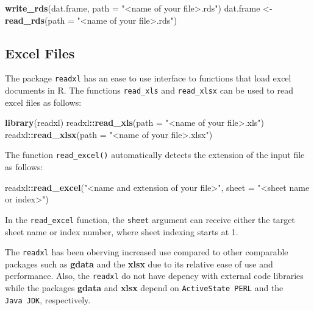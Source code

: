 \documentclass[]{book}
\newenvironment{Shaded}{\begin{snugshade}}{\end{snugshade}}
\newcommand{\KeywordTok}[1]{\textcolor[rgb]{0.13,0.29,0.53}{\textbf{#1}}}
\newcommand{\DataTypeTok}[1]{\textcolor[rgb]{0.13,0.29,0.53}{#1}}
\newcommand{\StringTok}[1]{\textcolor[rgb]{0.31,0.60,0.02}{#1}}
\newcommand{\OperatorTok}[1]{\textcolor[rgb]{0.81,0.36,0.00}{\textbf{#1}}}
\newcommand{\NormalTok}[1]{#1}
\theoremstyle{definition}
\theoremstyle{definition}
\theoremstyle{definition}
\theoremstyle{remark}
\begin{document}
\begin{Shaded}
\begin{Highlighting}[]
\KeywordTok{write_rds}\NormalTok{(dat.frame, }\DataTypeTok{path =} \StringTok{"<name of your file>.rds"}\NormalTok{)}
\NormalTok{dat.frame <-}\StringTok{ }\KeywordTok{read_rds}\NormalTok{(}\DataTypeTok{path =} \StringTok{"<name of your file>.rds"}\NormalTok{)}
\end{Highlighting}
\end{Shaded}

\subsection{Excel Files}\label{excel-files}

The package \texttt{readxl} has an ease to use interface to functions
that load excel documents in R. The functions \texttt{read\_xls} and
\texttt{read\_xlsx} can be used to read excel files as follows:

\begin{Shaded}
\begin{Highlighting}[]
\KeywordTok{library}\NormalTok{(readxl)}
\NormalTok{readxl}\OperatorTok{::}\KeywordTok{read_xls}\NormalTok{(}\DataTypeTok{path =} \StringTok{"<name of your file>.xls"}\NormalTok{)}
\NormalTok{readxl}\OperatorTok{::}\KeywordTok{read_xlsx}\NormalTok{(}\DataTypeTok{path =} \StringTok{"<name of your file>.xlsx"}\NormalTok{)}
\end{Highlighting}
\end{Shaded}

The function \texttt{read\_excel()} automatically detects the extension
of the input file as follows:

\begin{Shaded}
\begin{Highlighting}[]
\NormalTok{readxl}\OperatorTok{::}\KeywordTok{read_excel}\NormalTok{(}\StringTok{"<name and extension of your file>"}\NormalTok{, }\DataTypeTok{sheet =} \StringTok{"<sheet name or index>"}\NormalTok{)}
\end{Highlighting}
\end{Shaded}

In the \texttt{read\_excel} function, the \texttt{sheet} argument can
receive either the target sheet name or index number, where sheet
indexing starts at 1.

The \texttt{readxl} has been oberving increased use compared to other
comparable packages such as \textbf{gdata} and the \textbf{xlsx} due to
its relative ease of use and performance. Also, the \texttt{readxl} do
not have depency with external code libraries while the packages
\textbf{gdata} and \textbf{xlsx} depend on \texttt{ActiveState\ PERL}
and the \texttt{Java\ JDK}, respectively.
\end{document}
